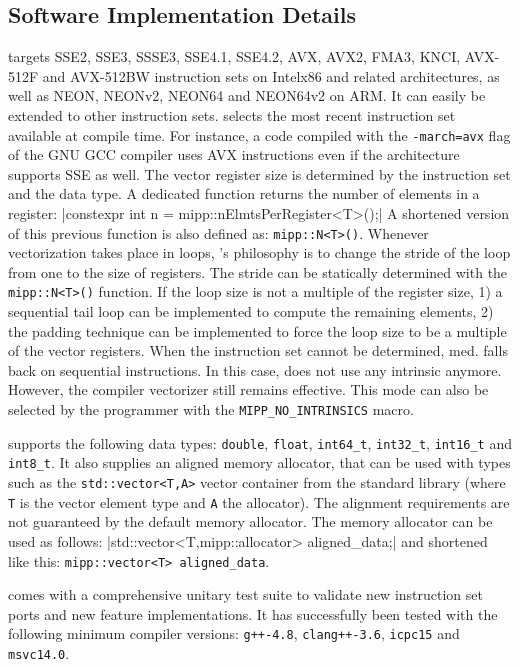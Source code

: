 \subsection{Software Implementation Details}
\label{sec:opt_mipp_implem}

\MIPP targets SSE2, SSE3, SSSE3, SSE4.1, SSE4.2, AVX, AVX2, FMA3, KNCI, AVX-512F
and AVX-512BW instruction sets on Intel\R x86 and related architectures, as well
as NEON, NEONv2, NEON64 and NEON64v2 on ARM\R. It can easily be extended to
other instruction sets. \MIPP selects the most recent instruction set available
at compile time. For instance, a code compiled with the \verb|-march=avx| flag
of the GNU GCC compiler uses AVX instructions even if the architecture supports
SSE as well. The vector register size is determined by the instruction set and
the data type. A dedicated function returns the number of elements in a \MIPP
register:
|constexpr int n = mipp::nElmtsPerRegister<T>();|
{\noindent
A shortened version of this previous function is also defined as:
\verb|mipp::N<T>()|. Whenever vectorization takes place in loops, \MIPP's
philosophy is to change the stride of the loop from one to the size of
registers. The stride can be statically determined with the \verb|mipp::N<T>()|
function. If the loop size is not a multiple of the register size, 1) a
sequential tail loop can be implemented to compute the remaining elements, 2)
the padding technique can be implemented to force the loop size to be a multiple
of the vector registers. When the instruction set cannot be determined, \MIPP
med. falls back on sequential instructions. In this case, \MIPP does not use any
intrinsic anymore. However, the compiler vectorizer still remains effective.
This mode can also be selected by the programmer with the
\verb|MIPP_NO_INTRINSICS| macro.
}

\MIPP supports the following data types: \verb|double|, \verb|float|,
\verb|int64_t|, \verb|int32_t|, \verb|int16_t| and \verb|int8_t|. It also
supplies an aligned memory allocator, that can be used with types such as the
\verb|std::vector<T,A>| vector container from the \Cxx standard library (where
\verb|T| is the vector element type and \verb|A| the allocator). The alignment
requirements are not guaranteed by the default \Cxx memory allocator. The \MIPP
memory allocator can be used as follows:
|std::vector<T,mipp::allocator> aligned_data;|
{\noindent
and shortened like this: \verb|mipp::vector<T> aligned_data|.
}

\MIPP comes with a comprehensive unitary test suite to validate new instruction
set ports and new feature implementations. It has successfully been tested with
the following minimum compiler versions: \verb|g++-4.8|, \verb|clang++-3.6|,
\verb|icpc15| and \verb|msvc14.0|.

